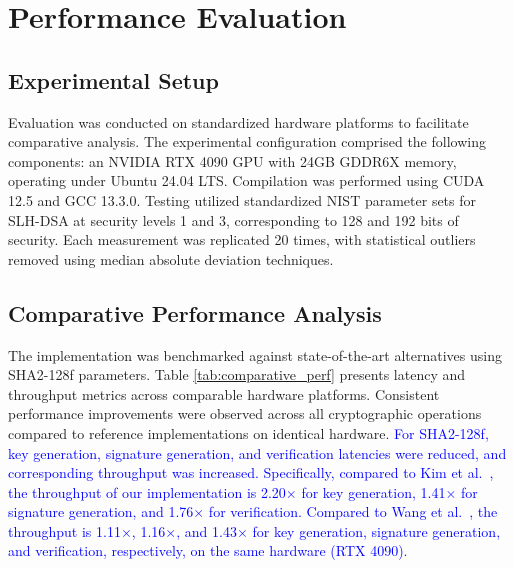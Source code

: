 \documentclass[journal]{IEEEtran}
\begin{document}
\color{black}

\section{Performance Evaluation}\label{sec:evaluation}

\subsection{Experimental Setup}

Evaluation was conducted on standardized hardware platforms to facilitate comparative analysis. The experimental configuration comprised the following components: an NVIDIA RTX 4090 GPU with 24GB GDDR6X memory, operating under Ubuntu 24.04 LTS. Compilation was performed using CUDA 12.5 and GCC 13.3.0.
Testing utilized standardized NIST parameter sets for SLH-DSA at security levels 1 and 3, corresponding to 128 and 192 bits of security. Each measurement was replicated 20 times, with statistical outliers removed using median absolute deviation techniques.

\subsection{Comparative Performance Analysis}

The implementation was benchmarked against state-of-the-art alternatives using SHA2-128f parameters. Table \ref{tab:comparative_perf} presents latency and throughput metrics across comparable hardware platforms.
Consistent performance improvements were observed across all cryptographic operations compared to reference implementations on identical hardware. 
\textcolor{blue}{For SHA2-128f, key generation, signature generation, and verification latencies were reduced, and corresponding throughput was increased. Specifically, compared to Kim et al.~\cite{Kim2024}, the throughput of our implementation is 2.20$\times$ for key generation, 1.41$\times$ for signature generation, and 1.76$\times$ for verification. Compared to Wang et al.~\cite{Wang2025}, the throughput is 1.11$\times$, 1.16$\times$, and 1.43$\times$ for key generation, signature generation, and verification, respectively, on the same hardware (RTX 4090).}
\end{document}
